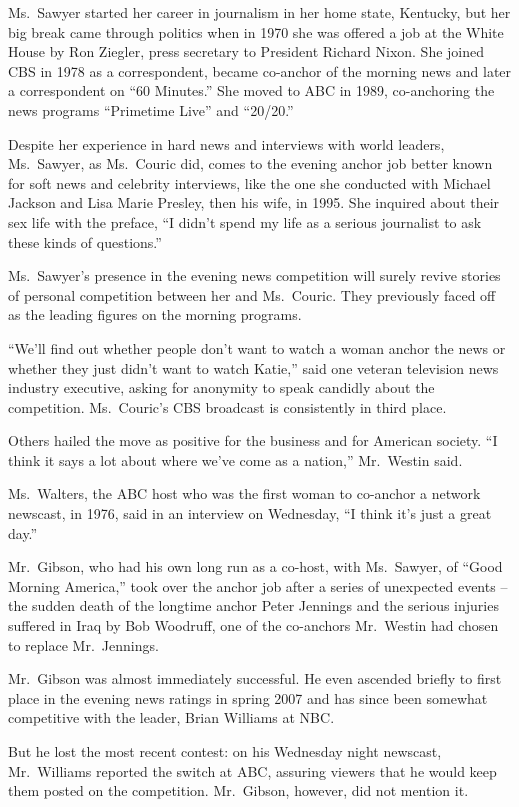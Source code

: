 ﻿\documentclass[12pt]{article}
\begin{document}
Ms.~Sawyer started her career in journalism in her home state, Kentucky, but her big break came
through politics when in 1970 she was offered a job at the White House by Ron Ziegler, press
secretary to President Richard Nixon. She joined CBS in 1978 as a correspondent, became co-anchor of
the morning news and later a correspondent on ``60 Minutes.'' She moved to ABC in 1989, co-anchoring
the news programs ``Primetime Live'' and ``20/20.''

Despite her experience in hard news and interviews with world leaders, Ms.~Sawyer, as Ms.~Couric
did, comes to the evening anchor job better known for soft news and celebrity interviews, like the
one she conducted with Michael Jackson and Lisa Marie Presley, then his wife, in 1995. She inquired
about their sex life with the preface, ``I didn't spend my life as a serious journalist to ask these
kinds of questions.''

Ms.~Sawyer's presence in the evening news competition will surely revive stories of personal
competition between her and Ms.~Couric. They previously faced off as the leading figures on the
morning programs.

``We'll find out whether people don't want to watch a woman anchor the news or whether they just
didn't want to watch Katie,'' said one veteran television news industry executive, asking for
anonymity to speak candidly about the competition. Ms.~Couric's CBS broadcast is consistently in
third place.

Others hailed the move as positive for the business and for American society. ``I think it says a
lot about where we've come as a nation,'' Mr.~Westin said.

Ms.~Walters, the ABC host who was the first woman to co-anchor a network newscast, in 1976, said in
an interview on Wednesday, ``I think it's just a great day.''

Mr.~Gibson, who had his own long run as a co-host, with Ms.~Sawyer, of ``Good Morning America,''
took over the anchor job after a series of unexpected events -- the sudden death of the longtime
anchor Peter Jennings and the serious injuries suffered in Iraq by Bob Woodruff, one of the
co-anchors Mr.~Westin had chosen to replace Mr.~Jennings.

Mr.~Gibson was almost immediately successful. He even ascended briefly to first place in the evening
news ratings in spring 2007 and has since been somewhat competitive with the leader, Brian Williams
at NBC.

But he lost the most recent contest: on his Wednesday night newscast, Mr.~Williams reported the
switch at ABC, assuring viewers that he would keep them posted on the competition. Mr.~Gibson,
however, did not mention it.
\end{document}
